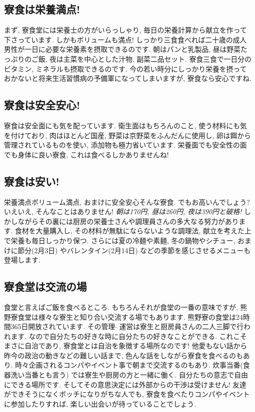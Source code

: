 \documentclass[10pt,b5jsbook,dvips,dvipdfmx,openany]{jsbook}
\theoremstyle{definition}
\begin{document}
		\subsection{寮食は栄養満点! }
 		まず, 寮食堂には栄養士の方がいらっしゃり, 毎日の栄養計算から献立を作って下さっています. しかもボリュームも満点! しっかり三食食べれば二十歳の成人男性が一日に必要な栄養素を摂取できるのです. 朝はパンと乳製品, 昼は野菜たっぷりのご飯, 夜は主菜を中心とした汁物, 副菜二品セット. 寮食三食で一日分のビタミン, ミネラルも摂取できるのです. 今の若い時分にしっかり栄養を摂っておかないと将来生活習慣病の予備軍になってしまいますが, 寮食なら安心ですね. 
 
		\subsection{寮食は安全安心! }
寮食は安全面にも気を配っています. 衛生面はもちろんのこと, 使う材料にも気を付けており, 肉はほとんど国産, 野菜は京野菜をふんだんに使用し, 卵は餌から管理されているものを使い, 添加物も極力省いています. 栄養面でも安全性の面でも身体に良い寮食, これは食べるしかありませんね! 

		\subsection{寮食は安い!}

		栄養満点ボリューム満点, おまけに安全安心そんな寮食. でもお高いんでしょう? いえいえ, そんなことはありません! \emph{朝は170円, 昼は260円, 夜は390円と破格! }しかしながらその裏には厨房の栄養士さんや調理員さんの多大なる努力があります. 食材を大量購入し, その材料が無駄にならないような調理法, 献立を考えた上で栄養も毎日しっかり保つ. さらには夏の冷麺や素麺, 冬の鍋物やシチュー, おまけに節分(2月3日) やバレンタイン(2月14日) などの季節を感じさせるメニューも登場します. 
 
		\subsection{寮食堂は交流の場}
		食堂と言えばご飯を食べるところ. もちろんそれが食堂の一番の意味ですが, 熊野寮食堂は様々な寮生と知り合い交流する場でもあります. 熊野寮の食堂は24時間365日開放されています. その管理$ \cdot $ 運営は寮生と厨房員さんの二人三脚で行われます. なので自分たちの好きな時に自分たちの好きなことができる. これこそまさに自治であり, 寮食堂とは自治を象徴する場所なのです! 他愛もない話から昨今の政治の動きなどの難しい話まで, 色んな話をしながら寮食を食べるのもあり. 時々企画されるコンパやイベント事で朝まで交流するのもあり. 炊事当番(食器洗い当番とも言う) では寮生や厨房の方と一緒に働く. 自分たちの意志で自由にできる場所です. そしてその意思決定には外部からの干渉は受けません! 友達ができそうになくボッチになりがちな人でも, 寮食を食べたりコンパやイベントに参加したりすれば, 楽しい出会いが待っていることでしょう. 
\end{document}
